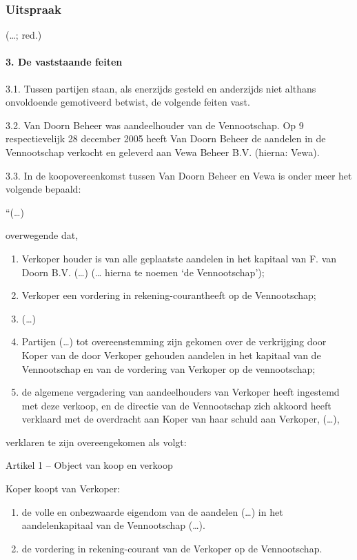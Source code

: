 \documentclass[
  dutch,
  a4paper,
]{article}
\begin{document}
\subsubsection{Uitspraak}\label{uitspraak}

(\ldots; red.)

\paragraph{3. De vaststaande feiten}\label{de-vaststaande-feiten}

3.1. Tussen partijen staan, als enerzijds gesteld en anderzijds niet althans onvoldoende gemotiveerd betwist, de volgende feiten vast.

3.2. Van Doorn Beheer was aandeelhouder van de Vennootschap. Op 9 respectievelijk 28 december 2005 heeft Van Doorn Beheer de aandelen in de Vennootschap verkocht en geleverd aan Vewa Beheer B.V. (hierna: Vewa).

3.3. In de koopovereenkomst tussen Van Doorn Beheer en Vewa is onder meer het volgende bepaald:

``(\ldots)

overwegende dat,

\begin{enumerate}
\def\labelenumi{\alph{enumi}.}
\item
  Verkoper houder is van alle geplaatste aandelen in het kapitaal van F. van Doorn B.V. (\ldots) (\ldots{} hierna te noemen `de Vennootschap');
\item
  Verkoper een vordering in rekening-courantheeft op de Vennootschap;
\item
  (\ldots)
\item
  Partijen (\ldots) tot overeenstemming zijn gekomen over de verkrijging door Koper van de door Verkoper gehouden aandelen in het kapitaal van de Vennootschap en van de vordering van Verkoper op de vennootschap;
\item
  de algemene vergadering van aandeelhouders van Verkoper heeft ingestemd met deze verkoop, en de directie van de Vennootschap zich akkoord heeft verklaard met de overdracht aan Koper van haar schuld aan Verkoper, (\ldots),
\end{enumerate}

verklaren te zijn overeengekomen als volgt:

Artikel 1 -- Object van koop en verkoop

Koper koopt van Verkoper:

\begin{enumerate}
\def\labelenumi{\arabic{enumi}.}
\item
  de volle en onbezwaarde eigendom van de aandelen (\ldots) in het aandelenkapitaal van de Vennootschap (\ldots).
\item
  de vordering in rekening-courant van de Verkoper op de Vennootschap.
\end{enumerate}
\end{document}
